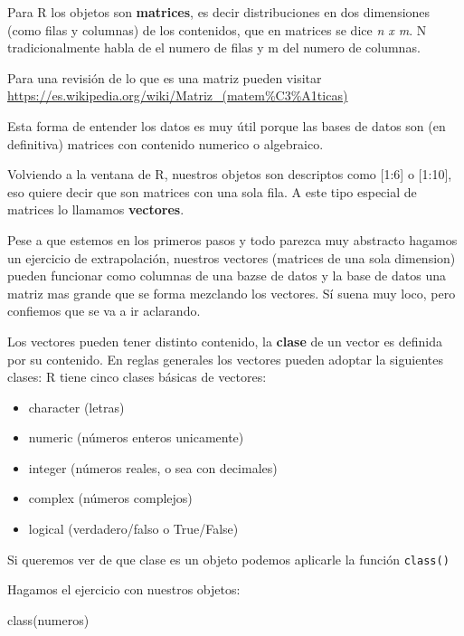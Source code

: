 \documentclass[
]{book}
\newenvironment{Shaded}{\begin{snugshade}}{\end{snugshade}}
\newcommand{\FunctionTok}[1]{\textcolor[rgb]{0.00,0.00,0.00}{#1}}
\newcommand{\NormalTok}[1]{#1}
\providecommand{\tightlist}{%
  \setlength{\itemsep}{0pt}\setlength{\parskip}{0pt}}
\begin{document}
Para R los objetos son \textbf{matrices}, es decir distribuciones en dos dimensiones (como filas y columnas) de los contenidos, que en matrices se dice \emph{n x m}. N tradicionalmente habla de el numero de filas y m del numero de columnas.

Para una revisión de lo que es una matriz pueden visitar \url{https://es.wikipedia.org/wiki/Matriz_(matem\%C3\%A1ticas)}

Esta forma de entender los datos es muy útil porque las bases de datos son (en definitiva) matrices con contenido numerico o algebraico.

Volviendo a la ventana de R, nuestros objetos son descriptos como {[}1:6{]} o {[}1:10{]}, eso quiere decir que son matrices con una sola fila. A este tipo especial de matrices lo llamamos \textbf{vectores}.

Pese a que estemos en los primeros pasos y todo parezca muy abstracto hagamos un ejercicio de extrapolación, nuestros vectores (matrices de una sola dimension) pueden funcionar como columnas de una bazse de datos y la base de datos una matriz mas grande que se forma mezclando los vectores. Sí suena muy loco, pero confiemos que se va a ir aclarando.

Los vectores pueden tener distinto contenido, la \textbf{clase} de un vector es definida por su contenido. En reglas generales los vectores pueden adoptar la siguientes clases:
R tiene cinco clases básicas de vectores:

\begin{itemize}
\tightlist
\item
  character (letras)
\item
  numeric (números enteros unicamente)
\item
  integer (números reales, o sea con decimales)
\item
  complex (números complejos)
\item
  logical (verdadero/falso o True/False)
\end{itemize}

Si queremos ver de que clase es un objeto podemos aplicarle la función \texttt{class()}

Hagamos el ejercicio con nuestros objetos:

\begin{Shaded}
\begin{Highlighting}[]
\FunctionTok{class}\NormalTok{(numeros)}
\end{Highlighting}
\end{Shaded}
\end{document}
